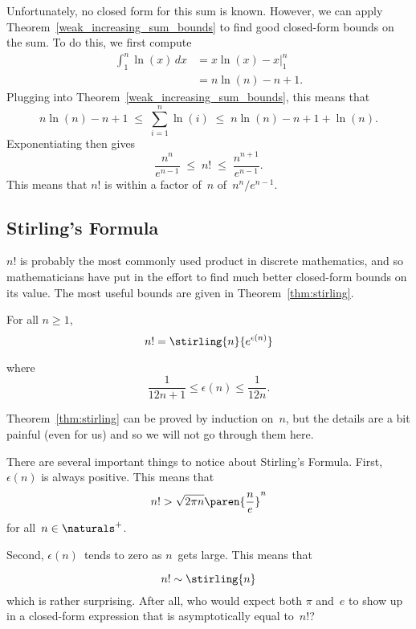 Unfortunately, no closed form for this sum is known.  However, we can
apply Theorem~\ref{weak_increasing_sum_bounds} to find good closed-form bounds on the
sum.  To do this, we first compute
\begin{align*}
\int_1^n \ln(x) \, dx
    &= x \ln(x) - x \Bigr|_1^n \\
    &= n \ln(n) - n + 1.
\end{align*}
Plugging into Theorem~\ref{weak_increasing_sum_bounds}, this means that
\[
    n \ln(n) - n + 1
    \;\le\; \sum_{i = 1}^n \ln(i)
    \;\le\; n \ln(n) - n + 1 + \ln(n).
\]
Exponentiating then gives
\begin{equation}\label{eqn:9Q1}
    \frac{n^n}{e^{n - 1}} \;\le\; n! \;\le\; \frac{n^{n + 1}}{e^{n - 1}}.
\end{equation}
This means that $n!$ is within a factor of~$n$ of~$n^n/e^{n - 1}$.

\subsection{Stirling's Formula}

$n!$ is probably the most commonly used product in discrete
mathematics, and so mathematicians have put in the effort to find much
better closed-form bounds on its value.  The most useful bounds are
given in Theorem~\ref{thm:stirling}.


\begin{theorem}\label{thm:stirling}
For all $n \ge 1$,
\[
    n! = \stirling{n}{e^{\epsilon(n)}}
\]

where
\[
    \frac{1}{12 n + 1} \le \epsilon(n) \le \frac{1}{12n}.
\]
\end{theorem}

Theorem~\ref{thm:stirling} can be proved by induction on~$n$, but the
details are a bit painful (even for us) and so we will not go through
them here.

There are several important things to notice about Stirling's
Formula.  First, $\epsilon(n)$ is always positive.  This means that
\begin{equation}\label{eqn:9ZA}
    n! > \sqrt{2\pi n} \paren{\frac{n}{e}}^n
\end{equation}
for all~$n \in \naturals^+$.

Second, $\epsilon(n)$~tends to zero as $n$~gets large.  This means
that
\iffalse
\footnote{The $\sim$ notation was defined in
  Section~\ref{sec:asymptotic_equality}.}
\fi
\begin{equation}\label{nfacsim}%
    n! \sim \stirling{n}
\end{equation}
which is rather surprising.  After all, who would expect both $\pi$
and~$e$ to show up in a closed-form expression that is asymptotically
equal to~$n!$?

